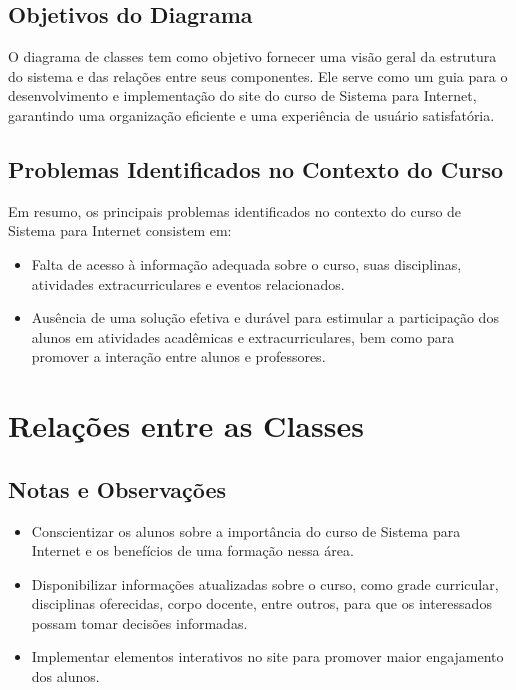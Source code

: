 \documentclass[a4paper,12pt]{report}
\begin{document}
\subsection{Objetivos do Diagrama}
 
O diagrama de classes tem como objetivo fornecer uma visão geral da estrutura do sistema e das relações entre seus componentes. Ele serve como um guia para o desenvolvimento e implementação do site do curso de Sistema para Internet, garantindo uma organização eficiente e uma experiência de usuário satisfatória.

\subsection{Problemas Identificados no Contexto do Curso}
 
Em resumo, os principais problemas identificados no contexto do curso de Sistema para Internet consistem em:
\begin{itemize}
    \item Falta de acesso à informação adequada sobre o curso, suas disciplinas, atividades extracurriculares e eventos relacionados.
    \item Ausência de uma solução efetiva e durável para estimular a participação dos alunos em atividades acadêmicas e extracurriculares, bem como para promover a interação entre alunos e professores.
\end{itemize}
 
\section{Relações entre as Classes} 
  
\subsection{Notas e Observações} 
  
\begin{itemize} 
  \item Conscientizar os alunos sobre a importância do curso de Sistema para Internet e os benefícios de uma formação nessa área. 
  \item Disponibilizar informações atualizadas sobre o curso, como grade curricular, disciplinas oferecidas, corpo docente, entre outros, para que os interessados possam tomar decisões informadas. 
  \item Implementar elementos interativos no site para promover maior engajamento dos alunos. 
\end{itemize} 
\end{document}
